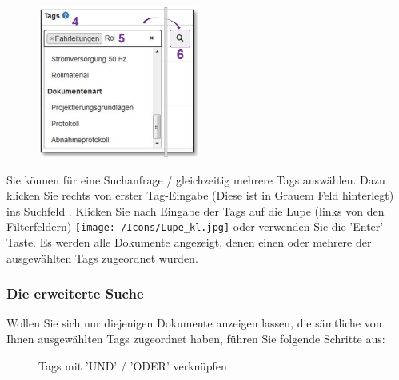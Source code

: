 \vspace{\baselineskip}

\begin{figure}
\vspace{-30pt}
\includegraphics[height=50mm]{../chapters/11_Dokumentenablage/pictures/11-2-8_TagEingabe.jpg}
\end{figure}
Sie können für eine Suchanfrage / gleichzeitig mehrere Tags auswählen. Dazu klicken Sie rechts von erster Tag-Eingabe  (Diese ist in Grauem Feld hinterlegt) ins Suchfeld . Klicken Sie nach Eingabe der Tags auf die Lupe (links von den Filterfeldern) \texttt{[image: /Icons/Lupe\_kl.jpg]}  oder verwenden Sie die 'Enter'-Taste. Es werden alle Dokumente angezeigt, denen einen oder mehrere der ausgewählten Tags zugeordnet wurden.

\vspace{\baselineskip}

\subsubsection{Die erweiterte Suche}

Wollen Sie sich nur diejenigen Dokumente anzeigen lassen, die sämtliche von Ihnen ausgewählten Tags zugeordnet haben, führen Sie folgende Schritte aus:

\begin{figure}[H]
\caption{Tags mit 'UND' / 'ODER' verknüpfen}
\end{figure}

